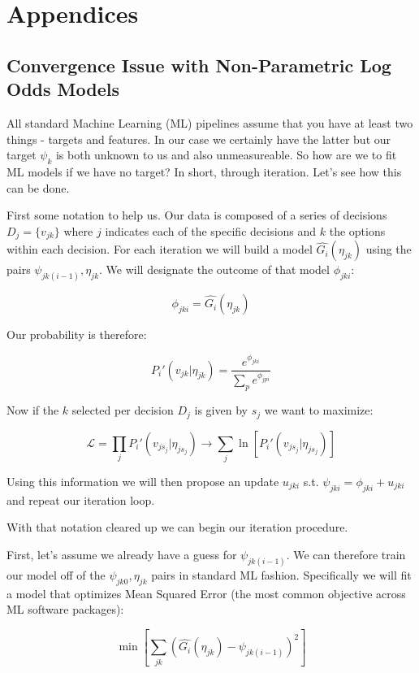 \documentclass[11pt]{article}
\begin{document}
\newpage
\section{Appendices}

\subsection{Convergence Issue with Non-Parametric Log Odds Models} \label{convergence issues}

All standard Machine Learning (ML) pipelines assume that you have at least two things - targets and features. In our case we certainly have the latter but our target $\psi_k$ is both unknown to us and also unmeasureable. So how are we to fit ML models if we have no target? In short, through iteration. Let's see how this can be done.\newline

First some notation to help us. Our data is composed of a series of decisions $D_j=\lbrace v_{jk} \rbrace$ where $j$ indicates each of the specific decisions and $k$ the options within each decision. For each iteration we will build a model $\hat{G_i}(\eta_{jk})$ using the pairs $\psi_{jk(i-1)},\eta_{jk}$. We will designate the outcome of that model $\phi_{jki}$:

$$\phi_{jki} = \hat{G_i}(\eta_{jk})$$

Our probability is therefore:

$$P_i'(v_{jk}|\eta_{jk})=\frac{e^{\phi_{jki}}}{\sum_p e^{\phi_{jpi}}}$$

Now if the $k$ selected per decision $D_j$ is given by $s_j$ we want to maximize:

$$\mathcal{L}=\prod_j P_i'(v_{js_j} | \eta_{js_j})\rightarrow \sum_j \ln{\left[ P_i'(v_{js_j} | \eta_{js_j}) \right]}$$

Using this information we will then propose an update $u_{jki}$ s.t. $\psi_{jki}=\phi_{jki} + u_{jki}$ and repeat our iteration loop. 

With that notation cleared up we can begin our iteration procedure. \newline

First, let's assume we already have a guess for $\psi_{jk(i-1)}$. We can therefore train our model off of the $\psi_{jk0},\eta_{jk}$ pairs in standard ML fashion. Specifically we will fit a model that optimizes Mean Squared Error (the most common objective across ML software packages):

$$\min{\left[ \sum_{jk}\left(\hat{G_i}(\eta_{jk}) - \psi_{jk(i-1)}\right)^2 \right]}$$
\end{document}
